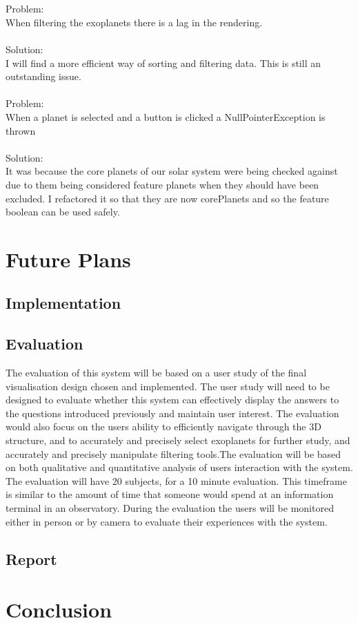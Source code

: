 \documentclass[11pt
              , a4paper
              , twoside
              , openright
              ]{report}
\begin{document}
\\\\
Problem:\\
When filtering the exoplanets there is a lag in the rendering. 
\\\\
Solution:\\
I will find a more efficient way of sorting and filtering data. This is still an outstanding issue.
\\\\
Problem:\\
When a planet is selected and a button is clicked a NullPointerException is thrown
\\\\
Solution:\\
It was because the core planets of our solar system were being checked against due to them being considered feature planets when they should have been excluded. I refactored it so that they are now corePlanets and so the feature boolean can be used safely.
\chapter{Future Plans}
\section{Implementation}
\section{Evaluation}
The evaluation of this system will be based on a user study of the final visualisation design
chosen and implemented. The user study will need to be designed to evaluate whether this
system can effectively display the answers to the questions introduced previously and maintain
user interest. The evaluation would also focus on the users ability to efficiently navigate
through the 3D structure, and to accurately and precisely select exoplanets for further study,
and accurately and precisely manipulate filtering tools.The evaluation will be based on both
qualitative and quantitative analysis of users interaction with the system.
The evaluation will have 20 subjects, for a 10 minute evaluation. This timeframe is similar to
the amount of time that someone would spend at an information terminal in an observatory.
During the evaluation the users will be monitored either in person or by camera to evaluate
their experiences with the system.
\section{Report}
\chapter{Conclusion}
\backmatter


%
\nocite{*}


\end{document}
